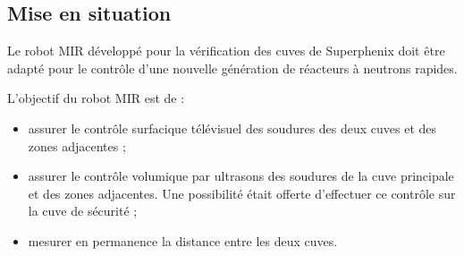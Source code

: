 \documentclass[10pt,fleqn]{article} %
\begin{document}

\vspace{5cm}
\pagestyle{fancy}
\thispagestyle{plain}

\def\columnseprulecolor{\color{ocre}}
\setlength{\columnseprule}{0.4pt} 

\def\pathfig{images}

\begin{multicols}{2}



\subsection*{Mise en situation}

Le robot MIR développé pour la vérification des cuves de Superphenix doit être adapté pour le contrôle d’une nouvelle génération de réacteurs à neutrons rapides.

L’objectif du robot MIR est de :
\begin{itemize}
\item assurer le contrôle surfacique télévisuel des soudures des deux cuves et des zones adjacentes ;
\item assurer le contrôle volumique par ultrasons des soudures de la cuve principale et des zones adjacentes. Une possibilité était offerte d’effectuer ce contrôle sur la cuve de sécurité ;
\item mesurer en permanence la distance entre les deux cuves.
\end{itemize}



\end{multicols}
\end{document}
